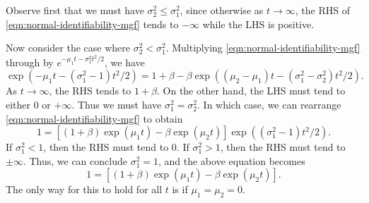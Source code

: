 Observe first that we must have $\sigma_2^2 \leq \sigma_1^2$, since otherwise as $t\rightarrow \infty$, the RHS of \cref{eqn:normal-identifiability-mgf} tends to $-\infty$ while the LHS is positive. 

Now consider the case where $\sigma_2^2 < \sigma_1^2$. Multiplying \cref{eqn:normal-identifiability-mgf} through by $e^{-\mu_1 t - \sigma_1^2 t^2/2}$, we have
\[ \exp\left( -\mu_1 t - (\sigma_1^2 - 1) t^2/2 \right) = 1+\beta - \beta \exp\left( (\mu_2 - \mu_1) t - (\sigma_1^2 -\sigma_2^2) t^2/2 \right).  \]
As $t\rightarrow \infty$, the RHS tends to $1 + \beta$. On the other hand, the LHS must tend to either 0 or $+\infty$. Thus we must have $\sigma_1^2 = \sigma_2^2$. In which case, we can rearrange \cref{eqn:normal-identifiability-mgf} to obtain
\[ 1 = \left[(1+\beta)\exp(\mu_1 t) - \beta \exp(\mu_2 t) \right] \exp\left( (\sigma_1^2 - 1)t^2/2 \right). \]
If $\sigma_1^2 < 1$, then the RHS must tend to 0. If $\sigma_1^2 > 1$, then the RHS must tend to $\pm \infty$. Thus, we can conclude $\sigma_1^2 = 1$, and the above equation becomes
\[ 1 = \left[(1+\beta)\exp(\mu_1 t) - \beta \exp(\mu_2 t) \right]. \]
The only way for this to hold for all $t$ is if $\mu_1 = \mu_2=0$.